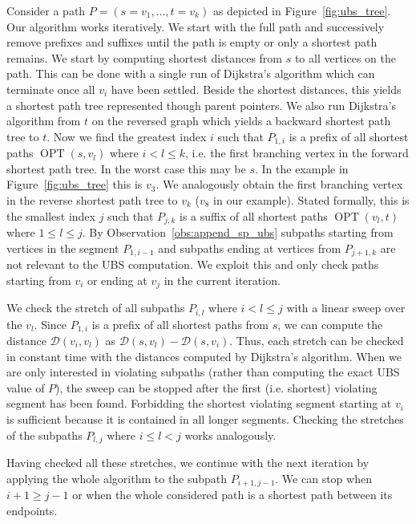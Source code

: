 \documentclass[a4paper,UKenglish,cleveref, autoref, thm-restate]{lipics-v2021}
\newcommand*{\dist}{\mathcal{D}}
\newcommand*{\shp}{\operatorname{OPT}}
\begin{document}
Consider a path $P=(s=v_1,\dots,t=v_k)$ as depicted in Figure~\ref{fig:ubs_tree}.
Our algorithm works iteratively.
We start with the full path and successively remove prefixes and suffixes until the path is empty or only a shortest path remains.
We start by computing shortest distances from $s$ to all vertices on the path.
This can be done with a single run of Dijkstra's algorithm which can terminate once all $v_i$ have been settled.
Beside the shortest distances, this yields a shortest path tree represented though parent pointers.
We also run Dijkstra's algorithm from $t$ on the reversed graph which yields a backward shortest path tree to $t$.
Now we find the greatest index $i$ such that $P_{1,i}$ is a prefix of all shortest paths $\shp(s, v_l)$ where $i < l \leq k$, i.e. the first branching vertex in the forward shortest path tree.
In the worst case this may be $s$.
In the example in Figure~\ref{fig:ubs_tree} this is $v_3$.
We analogously obtain the first branching vertex in the reverse shortest path tree to $v_k$ ($v_8$ in our example).
Stated formally, this is the smallest index $j$ such that $P_{j,k}$ is a suffix of all shortest paths $\shp(v_l, t)$ where $1 \leq l \leq j$.
By Observation~\ref{obs:append_sp_ubs} subpaths starting from vertices in the segment $P_{1,i-1}$ and subpaths ending at vertices from $P_{j+1,k}$ are not relevant to the UBS computation.
We exploit this and only check paths starting from $v_i$ or ending at $v_j$ in the current iteration.

We check the stretch of all subpaths $P_{i,l}$ where $i < l \leq j$ with a linear sweep over the $v_l$.
Since $P_{1,i}$ is a prefix of all shortest paths from $s$, we can compute the distance $\dist(v_i, v_l)$ as $\dist(s, v_l) - \dist(s, v_i)$.
Thus, each stretch can be checked in constant time with the distances computed by Dijkstra's algorithm.
When we are only interested in violating subpaths (rather than computing the exact UBS value of $P$), the sweep can be stopped after the first (i.e. shortest) violating segment has been found.
Forbidding the shortest violating segment starting at $v_i$ is sufficient because it is contained in all longer segments.
Checking the stretches of the subpaths $P_{l,j}$ where $i \leq l < j$ works analogously.

Having checked all these stretches, we continue with the next iteration by applying the whole algorithm to the subpath $P_{i+1,j-1}$.
We can stop when $i+1 \geq j-1$ or when the whole considered path is a shortest path between its endpoints.
\end{document}
